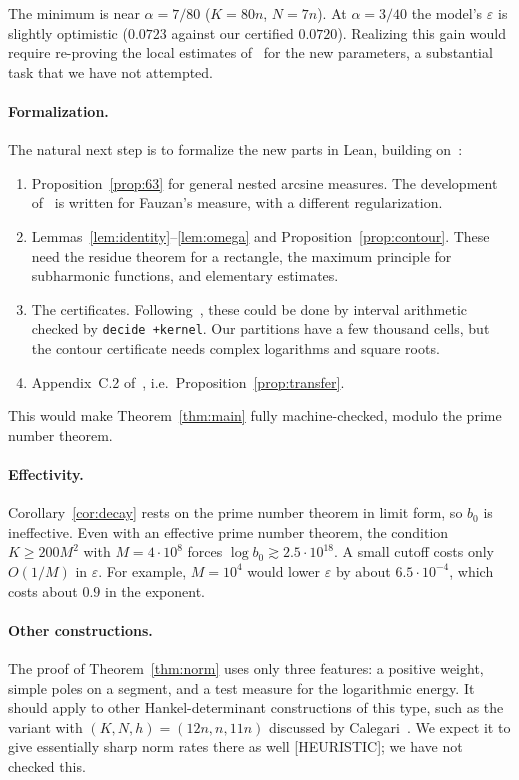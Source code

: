 \documentclass[11pt]{article}
\theoremstyle{remark}
\newcommand{\file}[1]{\texttt{#1}}
\begin{document}
\noindent The minimum is near $\alpha=7/80$ ($K=80n$, $N=7n$). At $\alpha=3/40$ the model's $\varepsilon$ is slightly optimistic ($0.0723$ against our certified $0.0720$). Realizing this gain would require re-proving the local estimates of~\cite[\S\S3--5]{F} for the new parameters, a substantial task that we have not attempted.

\paragraph{Formalization.} The natural next step is to formalize the new parts in Lean, building on~\cite{DR}:
\begin{enumerate}[label=(\roman*)]
\item Proposition~\ref{prop:63} for general nested arcsine measures. The development of~\cite{DR} is written for Fauzan's measure, with a different regularization.
\item Lemmas~\ref{lem:identity}--\ref{lem:omega} and Proposition~\ref{prop:contour}. These need the residue theorem for a rectangle, the maximum principle for subharmonic functions, and elementary estimates.
\item The certificates. Following~\cite{DR}, these could be done by interval arithmetic checked by \file{decide +kernel}. Our partitions have a few thousand cells, but the contour certificate needs complex logarithms and square roots.
\item Appendix~C.2 of~\cite{F}, i.e.\ Proposition~\ref{prop:transfer}.
\end{enumerate}
This would make Theorem~\ref{thm:main} fully machine-checked, modulo the prime number theorem.

\paragraph{Effectivity.} Corollary~\ref{cor:decay} rests on the prime number theorem in limit form, so $b_0$ is ineffective. Even with an effective prime number theorem, the condition $K\ge200M^2$ with $M=4\cdot10^8$ forces $\log b_0\gtrsim2.5\cdot10^{18}$. A small cutoff costs only $O(1/M)$ in $\varepsilon$. For example, $M=10^4$ would lower $\varepsilon$ by about $6.5\cdot10^{-4}$, which costs about $0.9$ in the exponent.

\paragraph{Other constructions.} The proof of Theorem~\ref{thm:norm} uses only three features: a positive weight, simple poles on a segment, and a test measure for the logarithmic energy. It should apply to other Hankel-determinant constructions of this type, such as the variant with $(K,N,h)=(12n,n,11n)$ discussed by Calegari~\cite{Ca}. We expect it to give essentially sharp norm rates there as well [HEURISTIC]; we have not checked this.
\end{document}
